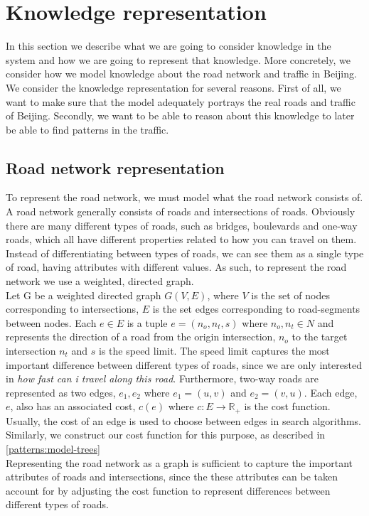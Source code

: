 \section{Knowledge representation}
In this section we describe what we are going to consider knowledge in the system and how we are going to represent that knowledge. More concretely, we consider how we model knowledge about the road network and traffic in Beijing. We consider the knowledge representation for several reasons. First of all, we want to make sure that the model adequately portrays the real roads and traffic of Beijing. Secondly, we want to be able to reason about this knowledge to later be able to find patterns in the traffic.

\subsection{Road network representation}
To represent the road network, we must model what the road network consists of. A road network generally consists of roads and intersections of roads. Obviously there are many different types of roads, such as bridges, boulevards and one-way roads, which all have different properties related to how you can travel on them. Instead of differentiating between types of roads, we can see them as a single type of road, having attributes with different values. As such, to represent the road network we use a weighted, directed graph.\\
Let G be a weighted directed graph $G(V,E)$, where $V$ is the set of nodes corresponding to intersections, $E$ is the set edges corresponding to road-segments between nodes. Each $e \in E$ is a tuple $e=(n_o, n_t, s)$ where $n_o, n_t \in N$ and represents the direction of a road from the origin intersection, $n_o$ to the target intersection $n_t$ and $s$ is the speed limit. The speed limit captures the most important difference between different types of roads, since we are only interested in \emph{how fast can i travel along this road}. Furthermore, two-way roads are represented as two edges, $e_1, e_2$ where $e_1 = (u, v)$ and $e_2=(v, u)$. Each edge, $e$, also has an associated cost, $c(e)$ where  $c: E \rightarrow \mathbb R_+$ is the cost function. Usually, the cost of an edge is used to choose between edges in search algorithms. Similarly, we construct our cost function for this purpose, as described in \ref{patterns:model-trees}
\\
Representing the road network as a graph is sufficient to capture the important attributes of roads and intersections, since the these attributes can be taken account for by adjusting the cost function to represent differences between different types of roads. 

